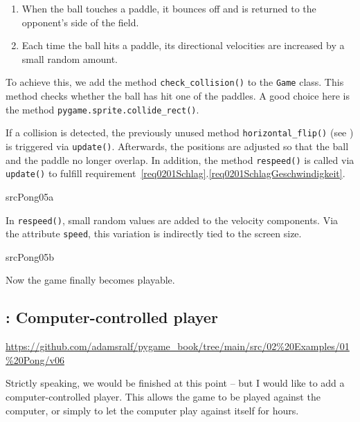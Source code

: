 
\begin{enumerate}
	\item When the ball touches a paddle, it bounces off and is returned to the opponent’s side of the field.\label{req0201SchlagZurück}
	\item Each time the ball hits a paddle, its directional velocities are increased by a small random amount.\label{req0201SchlagGeschwindigkeit}
\end{enumerate}
\er

To achieve this, we add the method \texttt{check\_collision()} to the \texttt{Game} class. This method checks whether the ball has hit one of the paddles. A good choice here is the method \texttt{pygame\-.sprite\-.coll\-ide\_rect()}.  

If a collision is detected, the previously unused method \texttt{horizontal\_flip()} (see ) is triggered via \texttt{update()}. Afterwards, the positions are adjusted so that the ball and the paddle no longer overlap. In addition, the method \texttt{respeed()} is called via \texttt{update()} to fulfill requirement~\ref{req0201Schlag}.\ref{req0201SchlagGeschwindigkeit}.

{srcPong05a}

In \texttt{respeed()}, small random values are added to the velocity components. Via the attribute \texttt{speed}, this variation is indirectly tied to the screen size.

{srcPong05b}

Now the game finally becomes playable.

\subsection{: Computer-controlled player}
\begin{diskbox}
	\url{https://github.com/adamsralf/pygame_book/tree/main/src/02%20Examples/01%20Pong/v06}
\end{diskbox}
Strictly speaking, we would be finished at this point -- but I would like to add a computer-controlled player. This allows the game to be played against the computer, or simply to let the computer play against itself for hours.

